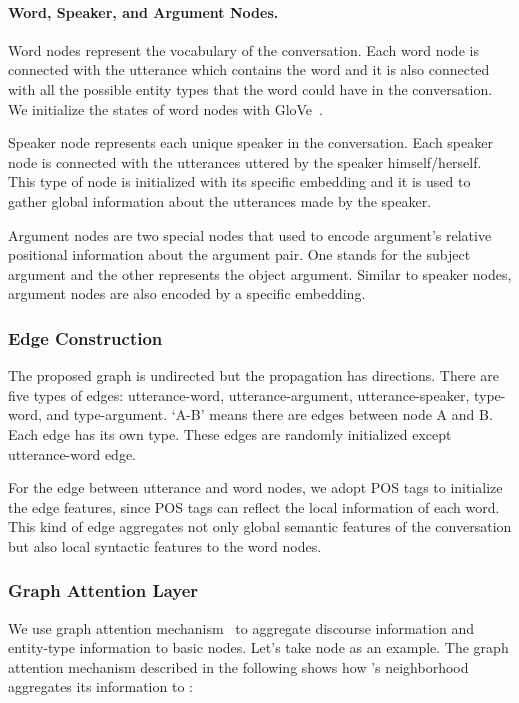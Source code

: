 \documentclass[letterpaper]{article} \usepackage{aaai21}  \usepackage{times}  \usepackage{helvet} \usepackage{courier}  \usepackage[hyphens]{url}  \usepackage{graphicx} \urlstyle{rm} \def\UrlFont{\rm}  \usepackage{natbib}  \usepackage{caption} \frenchspacing  \setlength{\pdfpagewidth}{8.5in}  \setlength{\pdfpageheight}{11in}
\begin{document}
\paragraph{Word, Speaker, and Argument Nodes.}
Word nodes represent the vocabulary of the conversation. Each word node is connected with the utterance which contains the word and it is also connected with all the possible entity types that the word could have in the conversation. We initialize the states of word nodes with GloVe~\cite{pennington2014glove}.

Speaker node represents each unique speaker in the conversation. Each speaker node is connected with the utterances uttered by the speaker himself/herself. This type of node is initialized with its specific embedding and it is used to gather global information about the utterances made by the speaker.

Argument nodes are two special nodes that used to encode argument's relative positional information about the argument pair. One stands for the subject argument and the other represents the object argument. Similar to speaker nodes, argument nodes are also encoded by a specific embedding.



\subsubsection{Edge Construction}
The proposed graph is undirected but the propagation has directions. There are five types of edges: utterance-word, utterance-argument, utterance-speaker, type-word, and type-argument. `A-B' means there are edges between node A and B. Each edge has its own type. These edges are randomly initialized except utterance-word edge.

For the edge between utterance and word nodes, we adopt POS tags to initialize the edge features, since POS tags can reflect the local information of each word. This kind of edge aggregates not only global semantic features of the conversation but also local syntactic features to the word nodes.







\subsubsection{Graph Attention Layer}
We use graph attention mechanism~\cite{velivckovic2017graph} to aggregate discourse information and entity-type information to basic nodes. Let's take node  as an example. The graph attention mechanism described in the following shows how 's neighborhood  aggregates its information to :
\end{document}
